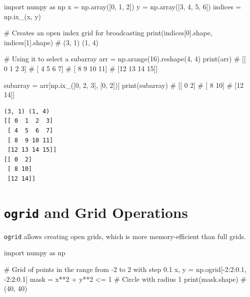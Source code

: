 \documentclass[
  english,
  letterpaper,
  DIV=11,
  numbers=noendperiod]{scrreprt}
\newenvironment{Shaded}{\begin{snugshade}}{\end{snugshade}}
\newcommand{\BuiltInTok}[1]{\textcolor[rgb]{0.00,0.23,0.31}{#1}}
\newcommand{\CommentTok}[1]{\textcolor[rgb]{0.37,0.37,0.37}{#1}}
\newcommand{\DecValTok}[1]{\textcolor[rgb]{0.68,0.00,0.00}{#1}}
\newcommand{\FloatTok}[1]{\textcolor[rgb]{0.68,0.00,0.00}{#1}}
\newcommand{\ImportTok}[1]{\textcolor[rgb]{0.00,0.46,0.62}{#1}}
\newcommand{\NormalTok}[1]{\textcolor[rgb]{0.00,0.23,0.31}{#1}}
\newcommand{\OperatorTok}[1]{\textcolor[rgb]{0.37,0.37,0.37}{#1}}
\begin{document}
\begin{Shaded}
\begin{Highlighting}[]
\ImportTok{import}\NormalTok{ numpy }\ImportTok{as}\NormalTok{ np}
\NormalTok{x }\OperatorTok{=}\NormalTok{ np.array([}\DecValTok{0}\NormalTok{, }\DecValTok{1}\NormalTok{, }\DecValTok{2}\NormalTok{])}
\NormalTok{y }\OperatorTok{=}\NormalTok{ np.array([}\DecValTok{3}\NormalTok{, }\DecValTok{4}\NormalTok{, }\DecValTok{5}\NormalTok{, }\DecValTok{6}\NormalTok{])}
\NormalTok{indices }\OperatorTok{=}\NormalTok{ np.ix\_(x, y)}

\CommentTok{\# Creates an open index grid for broadcasting}
\BuiltInTok{print}\NormalTok{(indices[}\DecValTok{0}\NormalTok{].shape, indices[}\DecValTok{1}\NormalTok{].shape)  }\CommentTok{\# (3, 1) (1, 4)}

\CommentTok{\# Using it to select a subarray}
\NormalTok{arr }\OperatorTok{=}\NormalTok{ np.arange(}\DecValTok{16}\NormalTok{).reshape(}\DecValTok{4}\NormalTok{, }\DecValTok{4}\NormalTok{)}
\BuiltInTok{print}\NormalTok{(arr)}
\CommentTok{\# [[ 0  1  2  3]}
\CommentTok{\#  [ 4  5  6  7]}
\CommentTok{\#  [ 8  9 10 11]}
\CommentTok{\#  [12 13 14 15]]}

\NormalTok{subarray }\OperatorTok{=}\NormalTok{ arr[np.ix\_([}\DecValTok{0}\NormalTok{, }\DecValTok{2}\NormalTok{, }\DecValTok{3}\NormalTok{], [}\DecValTok{0}\NormalTok{, }\DecValTok{2}\NormalTok{])]}
\BuiltInTok{print}\NormalTok{(subarray)}
\CommentTok{\# [[ 0  2]}
\CommentTok{\#  [ 8 10]}
\CommentTok{\#  [12 14]]}
\end{Highlighting}
\end{Shaded}

\begin{verbatim}
(3, 1) (1, 4)
[[ 0  1  2  3]
 [ 4  5  6  7]
 [ 8  9 10 11]
 [12 13 14 15]]
[[ 0  2]
 [ 8 10]
 [12 14]]
\end{verbatim}

\section{\texorpdfstring{\texttt{ogrid} and Grid
Operations}{ogrid and Grid Operations}}\label{ogrid-and-grid-operations}

\texttt{ogrid} allows creating open grids, which is more
memory-efficient than full grids.

\begin{Shaded}
\begin{Highlighting}[]
\ImportTok{import}\NormalTok{ numpy }\ImportTok{as}\NormalTok{ np}

\CommentTok{\# Grid of points in the range from {-}2 to 2 with step 0.1}
\NormalTok{x, y }\OperatorTok{=}\NormalTok{ np.ogrid[}\OperatorTok{{-}}\DecValTok{2}\NormalTok{:}\DecValTok{2}\NormalTok{:}\FloatTok{0.1}\NormalTok{, }\OperatorTok{{-}}\DecValTok{2}\NormalTok{:}\DecValTok{2}\NormalTok{:}\FloatTok{0.1}\NormalTok{]}
\NormalTok{mask }\OperatorTok{=}\NormalTok{ x}\OperatorTok{**}\DecValTok{2} \OperatorTok{+}\NormalTok{ y}\OperatorTok{**}\DecValTok{2} \OperatorTok{\textless{}=} \DecValTok{1}  \CommentTok{\# Circle with radius 1}
\BuiltInTok{print}\NormalTok{(mask.shape)  }\CommentTok{\# (40, 40)}
\end{Highlighting}
\end{Shaded}
\end{document}
